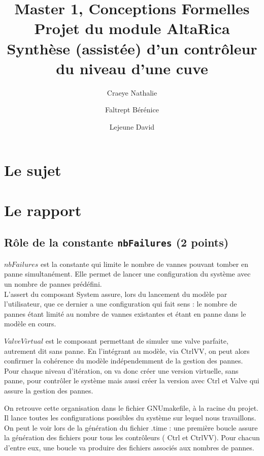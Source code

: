 \documentclass[a4paper]{book}
\newcommand{\altarica}{{\sc AltaRica}}
\begin{document}
\title{Master 1, Conceptions Formelles\\
Projet du module \altarica\\
Synthèse (assistée) d'un contrôleur du niveau d'une cuve}

\date{}

\author{Craeye Nathalie \and Faltrept Bérénice \and Lejeune David}

\maketitle

\chapter{Le sujet}


\chapter{Le rapport}
\section{Rôle de la constante {\tt nbFailures} (2 points)}

$nbFailures$ est la constante qui limite le nombre de vannes pouvant tomber en panne simultanément. Elle permet de lancer une configuration du système avec un nombre de pannes prédéfini. \\
L'assert du composant System assure, lors du lancement du modèle par l'utilisateur, que ce dernier a une configuration qui fait sens : le nombre de pannes étant limité au nombre de vannes existantes et étant en panne dans le modèle en cours.

$ValveVirtual$ est le composant permettant de simuler une valve parfaite, autrement dit sans panne. En l'intégrant au modèle, via CtrlVV, on peut alors confirmer la cohérence du modèle indépendemment de la gestion des pannes. \\
Pour chaque niveau d'itération, on va donc créer une version virtuelle, sans panne, pour contrôler le système mais aussi créer la version avec Ctrl et Valve qui assure la gestion des pannes.

On retrouve cette organisation dans le fichier GNUmakefile, à la racine du projet. Il lance toutes les configurations possibles du système sur lequel nous travaillons. On peut le voir lors de la génération du fichier .time : une première boucle assure la génération des fichiers pour tous les contrôleurs ( Ctrl et CtrlVV). Pour chacun d'entre eux, une boucle va produire des fichiers associés aux nombres de pannes.
\end{document}
